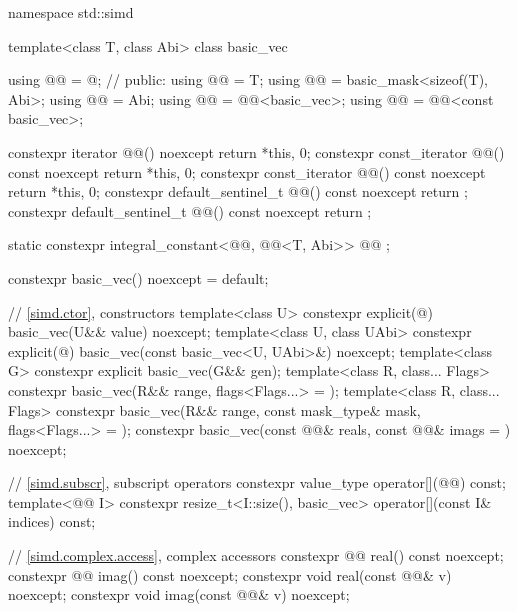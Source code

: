 %
\begin{codeblock}
namespace std::simd {
  template<class T, class Abi> class basic_vec {
    using @@ = @\seebelow@;                // \expos
  public:
    using @@ = T;
    using @@ = basic_mask<sizeof(T), Abi>;
    using @@ = Abi;
    using @@ = @@<basic_vec>;
    using @@ = @@<const basic_vec>;

    constexpr iterator @@() noexcept { return {*this, 0}; }
    constexpr const_iterator @@() const noexcept { return {*this, 0}; }
    constexpr const_iterator @@() const noexcept { return {*this, 0}; }
    constexpr default_sentinel_t @@() const noexcept { return {}; }
    constexpr default_sentinel_t @@() const noexcept { return {}; }

    static constexpr integral_constant<@@, @@<T, Abi>> @@ {};

    constexpr basic_vec() noexcept = default;

    // \ref{simd.ctor},  constructors
    template<class U>
      constexpr explicit(@\seebelow@) basic_vec(U&& value) noexcept;
    template<class U, class UAbi>
      constexpr explicit(@\seebelow@) basic_vec(const basic_vec<U, UAbi>&) noexcept;
    template<class G>
      constexpr explicit basic_vec(G&& gen);
    template<class R, class... Flags>
      constexpr basic_vec(R&& range, flags<Flags...> = {});
    template<class R, class... Flags>
      constexpr basic_vec(R&& range, const mask_type& mask, flags<Flags...> = {});
    constexpr basic_vec(const @@& reals, const @@& imags = {}) noexcept;

    // \ref{simd.subscr},  subscript operators
    constexpr value_type operator[](@@) const;
    template<@@ I>
      constexpr resize_t<I::size(), basic_vec> operator[](const I& indices) const;

    // \ref{simd.complex.access},  complex accessors
    constexpr @@ real() const noexcept;
    constexpr @@ imag() const noexcept;
    constexpr void real(const @@& v) noexcept;
    constexpr void imag(const @@& v) noexcept;

}}
\end{codeblock}
